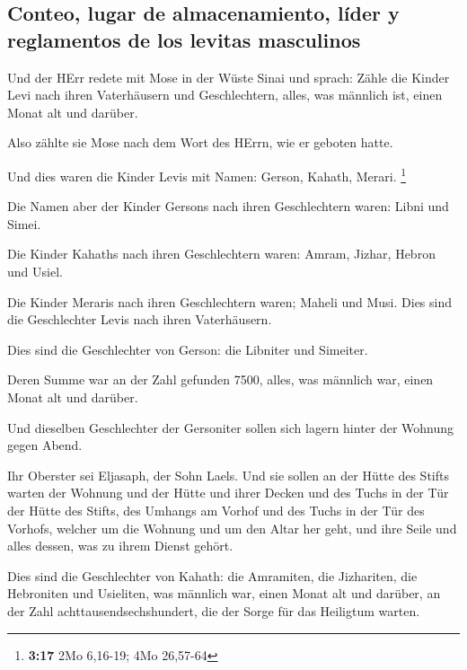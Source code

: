 \hypertarget{conteo-lugar-de-almacenamiento-luxedder-y-reglamentos-de-los-levitas-masculinos}{%
\subsection{Conteo, lugar de almacenamiento, líder y reglamentos de los
levitas
masculinos}\label{conteo-lugar-de-almacenamiento-luxedder-y-reglamentos-de-los-levitas-masculinos}}

 Und der HErr redete mit Mose in der Wüste Sinai und
sprach:  Zähle die Kinder Levi nach ihren Vaterhäusern
und Geschlechtern, alles, was männlich ist, einen Monat alt und darüber.

 Also zählte sie Mose nach dem Wort des HErrn, wie er
geboten hatte.

 Und dies waren die Kinder Levis mit Namen: Gerson,
Kahath, Merari. \footnote{\textbf{3:17} 2Mo 6,16-19; 4Mo 26,57-64}

 Die Namen aber der Kinder Gersons nach ihren
Geschlechtern waren: Libni und Simei.

 Die Kinder Kahaths nach ihren Geschlechtern waren:
Amram, Jizhar, Hebron und Usiel.

 Die Kinder Meraris nach ihren Geschlechtern waren;
Maheli und Musi. Dies sind die Geschlechter Levis nach ihren
Vaterhäusern.

 Dies sind die Geschlechter von Gerson: die Libniter und
Simeiter.

 Deren Summe war an der Zahl gefunden 7500, alles, was
männlich war, einen Monat alt und darüber.

 Und dieselben Geschlechter der Gersoniter sollen sich
lagern hinter der Wohnung gegen Abend.

 Ihr Oberster sei Eljasaph, der Sohn Laels.
 Und sie sollen an der Hütte des Stifts warten der
Wohnung und der Hütte und ihrer Decken und des Tuchs in der Tür der
Hütte des Stifts,  des Umhangs am Vorhof und des Tuchs in
der Tür des Vorhofs, welcher um die Wohnung und um den Altar her geht,
und ihre Seile und alles dessen, was zu ihrem Dienst gehört.

 Dies sind die Geschlechter von Kahath: die Amramiten,
die Jizhariten, die Hebroniten und Usieliten,  was
männlich war, einen Monat alt und darüber, an der Zahl
achttausendsechshundert, die der Sorge für das Heiligtum warten.

